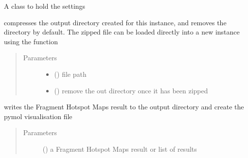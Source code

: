 \documentclass[letterpaper,10pt,english]{sphinxmanual}
\begin{document}
\begin{fulllineitems}
\begin{fulllineitems}
\label{\detokenize{hs_io_api:hotspots.hs_io.HotspotWriter.Settings}}
A class to hold the {\hyperref[\detokenize{hs_io_api:hotspots.hs_io.HotspotWriter}]{}} settings

\end{fulllineitems}


\begin{fulllineitems}
\label{\detokenize{hs_io_api:hotspots.hs_io.HotspotWriter.compress}}
compresses the output directory created for this  instance, and
removes the directory by default. The zipped file can be loaded directly into a new
 instance using the
 function
\begin{quote}\begin{description}
\item[{Parameters}] \leavevmode\begin{itemize}
\item {} 
 () \textendash{} file path

\item {} 
 () \textendash{} remove the out directory once it has been zipped

\end{itemize}

\end{description}\end{quote}

\end{fulllineitems}


\begin{fulllineitems}
\label{\detokenize{hs_io_api:hotspots.hs_io.HotspotWriter.write}}
writes the Fragment Hotspot Maps result to the output directory and create the pymol visualisation file
\begin{quote}\begin{description}
\item[{Parameters}] \leavevmode
{} () \textendash{} a Fragment Hotspot Maps result or list of results


\end{description}
\end{quote}
\end{fulllineitems}
\end{fulllineitems}
\end{document}
